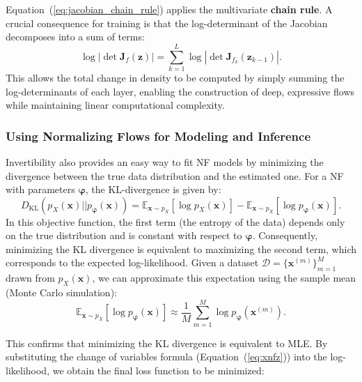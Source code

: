 Equation~(\ref{eq:jacobian_chain_rule}) applies the multivariate \textbf{chain rule}. A crucial consequence for training is that the log-determinant of the Jacobian decomposes into a sum of terms:
\begin{equation}
    \log \left| \det \boldsymbol{J}_f(\boldsymbol{z}) \right| = \sum_{k=1}^{L} \log \left| \det \boldsymbol{J}_{f_k}(\boldsymbol{z}_{k-1}) \right|.
\end{equation}
This allows the total change in density to be computed by simply summing the log-determinants of each layer, enabling the construction of deep, expressive flows while maintaining linear computational complexity.

\subsubsection{Using Normalizing Flows for Modeling and Inference}
Invertibility also provides an easy way to fit \ac{NF} models by minimizing the divergence between the true data distribution and the estimated one. For a \ac{NF} with parameters $\boldsymbol{\varphi}$, the KL-divergence is given by:
\begin{equation}
    D_{\text{KL}}(p_X(\boldsymbol{x}) || p_{\boldsymbol{\varphi}}(\boldsymbol{x})) = 
    \mathbb{E}_{\boldsymbol{x} \sim p_X}[\log p_X(\boldsymbol{x})] - \mathbb{E}_{\boldsymbol{x} \sim p_X}[\log p_{\boldsymbol{\varphi}}(\boldsymbol{x})].
\end{equation}
In this objective function, the first term (the entropy of the data) depends only on the true distribution and is constant with respect to $\boldsymbol{\varphi}$. Consequently, minimizing the KL divergence is equivalent to maximizing the second term, which corresponds to the expected log-likelihood. Given a dataset $\mathcal{D} = \{\boldsymbol{x}^{(m)}\}_{m=1}^M$ drawn from $p_X(\boldsymbol{x})$, we can approximate this expectation using the sample mean (Monte Carlo simulation):
\begin{equation}
    \mathbb{E}_{\boldsymbol{x} \sim p_X}[\log p_{\boldsymbol{\varphi}}(\boldsymbol{x})] \approx \frac{1}{M}\sum_{m=1}^{M}\log p_{\boldsymbol{\varphi}}(\boldsymbol{x}^{(m)}).
\end{equation}

This confirms that minimizing the KL divergence is equivalent to \ac{MLE}. By substituting the change of variables formula (Equation~(\ref{eq:xnfz})) into the log-likelihood, we obtain the final loss function to be minimized:

